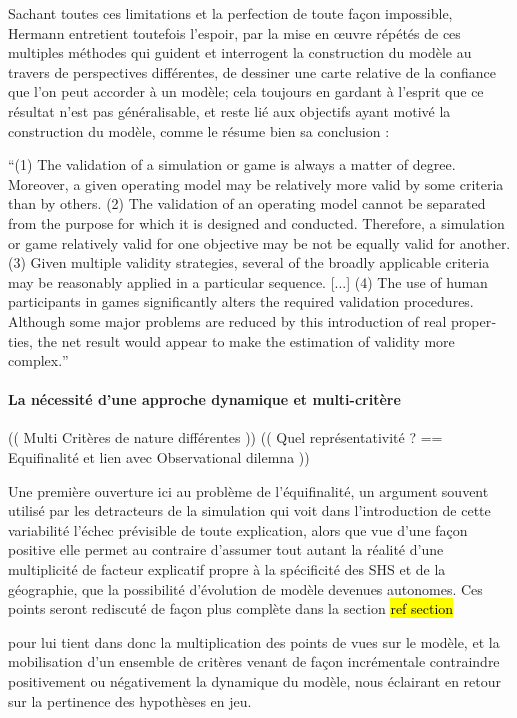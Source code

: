 Sachant toutes ces limitations et la perfection de toute façon impossible, Hermann entretient toutefois l'espoir, par la mise en œuvre répétés de ces multiples méthodes qui guident et interrogent la construction du modèle au travers de perspectives différentes, de dessiner une carte relative de la confiance que l'on peut accorder à un modèle; cela toujours en gardant à l'esprit que ce résultat n'est pas généralisable, et reste lié aux objectifs ayant motivé la construction du modèle, comme le résume bien sa conclusion :

\foreignquote{english}{(1) The validation of a simulation or game is always a matter of degree. Moreover, a given operating model may be relatively more valid by some criteria than by others. (2) The validation of an operating model cannot be separated from the purpose for which it is designed and conducted. Therefore, a simulation or game relatively valid for one objective may be not be equally valid for another. (3) Given multiple validity strategies, several of the broadly applicable criteria may be reasonably applied in a particular sequence. [...] (4) The use of human participants in games significantly alters the required validation procedures. Although some major problems are reduced by this introduction of real properties, the net result would appear to make the estimation of validity more complex.} \textcite{Hermann1967}

\paragraph{La nécessité d'une approche dynamique et multi-critère}

(( Multi Critères de nature différentes ))
(( Quel représentativité ? == Equifinalité et lien avec Observational dilemna ))

 Une première ouverture ici au problème de l'équifinalité, un argument souvent utilisé par les detracteurs de la simulation qui voit dans l'introduction de cette variabilité l'échec prévisible de toute explication, alors que vue d'une façon positive elle permet au contraire d'assumer tout autant la réalité d'une multiplicité de facteur explicatif propre à la spécificité des SHS et de la géographie, que la possibilité d'évolution de modèle devenues autonomes. Ces points seront rediscuté de façon plus complète dans la section \hl{ref section}

pour lui tient dans donc la multiplication des points de vues sur le modèle, et la mobilisation d'un ensemble de critères venant de façon incrémentale contraindre positivement ou négativement la dynamique du modèle, nous éclairant en retour sur la pertinence des hypothèses en jeu.

